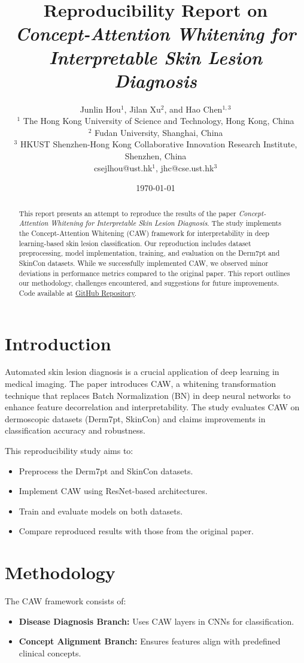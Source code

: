 \documentclass[a4paper,11pt]{article}
\title{Reproducibility Report on \emph{Concept-Attention Whitening for Interpretable Skin Lesion Diagnosis}}
\author{
    Junlin Hou$^1$, Jilan Xu$^2$, and Hao Chen$^{1,3}$ \\  
    $^1$ The Hong Kong University of Science and Technology, Hong Kong, China\\
    $^2$ Fudan University, Shanghai, China\\
    $^3$ HKUST Shenzhen-Hong Kong Collaborative Innovation Research Institute, Shenzhen, China\\
    csejlhou@ust.hk$^1$, jhc@cse.ust.hk$^3$
}
\date{\today}
\begin{document}
\maketitle
\begin{abstract}
This report presents an attempt to reproduce the results of the paper \textit{Concept-Attention Whitening for Interpretable Skin Lesion Diagnosis}\cite{hou2024caw}. The study implements the Concept-Attention Whitening (CAW) framework for interpretability in deep learning-based skin lesion classification. Our reproduction includes dataset preprocessing, model implementation, training, and evaluation on the Derm7pt and SkinCon datasets. While we successfully implemented CAW, we observed minor deviations in performance metrics compared to the original paper. This report outlines our methodology, challenges encountered, and suggestions for future improvements. 
Code available at \href{https://github.com/CAWframework/Concept-Attention-Whitening-for-Interpretable-Skin-Lesion-Diagnosis-Reproduction.git}{GitHub Repository}.

\end{abstract}

\section{Introduction}
Automated skin lesion diagnosis is a crucial application of deep learning in medical imaging. The paper introduces CAW, a whitening transformation technique\cite{chen2020concept} that replaces Batch Normalization (BN) in deep neural networks to enhance feature decorrelation and interpretability. The study evaluates CAW on dermoscopic datasets (Derm7pt, SkinCon)\cite{bie2024mica, patricio2023coherent} and claims improvements in classification accuracy and robustness.

This reproducibility study aims to:
\begin{itemize}
    \item Preprocess the Derm7pt and SkinCon datasets\cite{kawahara2019seven}.
    \item Implement CAW using ResNet-based architectures.
    \item Train and evaluate models on both datasets.
    \item Compare reproduced results with those from the original paper.
\end{itemize}

\section{Methodology}
The CAW framework consists of:
\begin{itemize}
    \item \textbf{Disease Diagnosis Branch:} Uses CAW layers in CNNs for classification.
    \item \textbf{Concept Alignment Branch:} Ensures features align with predefined clinical concepts.
\end{itemize}
\end{document}

